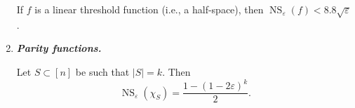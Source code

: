 \documentclass[letterpaper, reqno,11pt]{article}
\DeclareMathOperator{\NS}{NS}
\begin{document}
\begin{enumerate}[label=(\roman*)]
  \begin{theorem}
    If $f$ is a linear threshold function (i.e., a half-space), then $\NS_\varepsilon(f) < 8.8 \sqrt{\varepsilon}$.
  \end{theorem}
  \item {\bf \em Parity functions.}
  
  \begin{proposition}
    Let $S \subset [n]$ be such that $|S| = k$. Then
    $$ \NS_\varepsilon\left(\chi_S\right) = \frac{1 - (1 - 2\varepsilon)^k}{2}. $$
  \end{proposition}
\end{enumerate}
\end{document}
